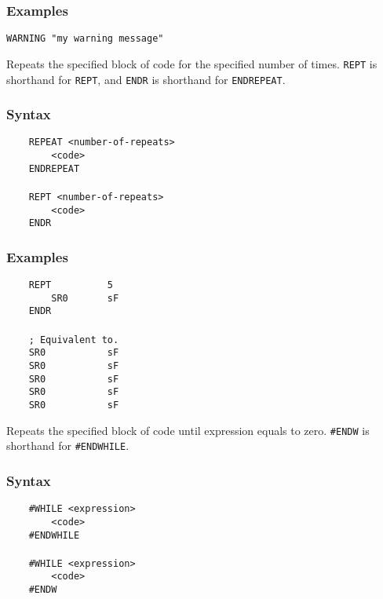         \subsubsection{Examples}
            \verb'WARNING "my warning message"'

    \clearpage
        Repeats the specified block of code for the specified number of times. \texttt{REPT} is shorthand for \texttt{REPT}, and \texttt{ENDR} is shorthand for \texttt{ENDREPEAT}.

        \subsubsection{Syntax}
            \verb'    REPEAT <number-of-repeats>'\\
            \verb'        <code>'\\
            \verb'    ENDREPEAT'\\
            \verb''\\
            \verb'    REPT <number-of-repeats>'\\
            \verb'        <code>'\\
            \verb'    ENDR'

        \subsubsection{Examples}
            \verb'    REPT          5'\\
            \verb'        SR0       sF'\\
            \verb'    ENDR'\\
            \verb''\\
            \verb'    ; Equivalent to.'\\
            \verb'    SR0           sF'\\
            \verb'    SR0           sF'\\
            \verb'    SR0           sF'\\
            \verb'    SR0           sF'\\
            \verb'    SR0           sF'

    \clearpage
        Repeats the specified block of code until expression equals to zero. \texttt{\#ENDW} is shorthand for \texttt{\#ENDWHILE}.

        \subsubsection{Syntax}
            \verb'    #WHILE <expression>'\\
            \verb'        <code>'\\
            \verb'    #ENDWHILE'\\
            \verb''\\
            \verb'    #WHILE <expression>'\\
            \verb'        <code>'\\
            \verb'    #ENDW'

